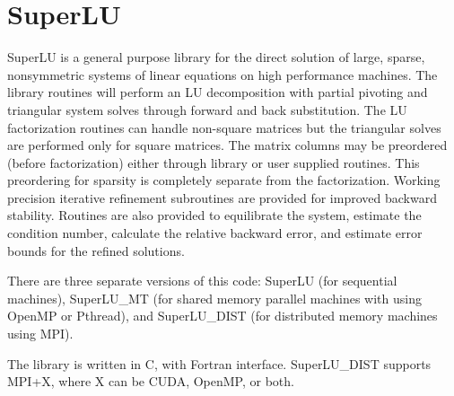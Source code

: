 \section{SuperLU}
SuperLU is a general purpose library for the direct solution of large, sparse,
nonsymmetric systems of linear equations on high performance machines. The library routines will perform an LU decomposition with partial pivoting and triangular system solves through forward and back substitution. The LU factorization routines can handle non-square matrices but the triangular solves are performed only for square matrices. The matrix columns may be preordered (before factorization) either through library or user supplied routines. This preordering for sparsity is completely separate from the factorization. Working precision iterative refinement subroutines are provided for improved backward stability. Routines are also provided to equilibrate the system, estimate the condition number, calculate the relative backward error, and estimate error bounds for the refined solutions.

There are three separate versions of this code: SuperLU (for sequential machines),
SuperLU\_MT (for shared memory parallel machines with using OpenMP or Pthread), and SuperLU\_DIST (for distributed memory machines using MPI).

The library is written in C, with Fortran interface.  SuperLU\_DIST supports MPI+X, where X can be CUDA, OpenMP, or both.
